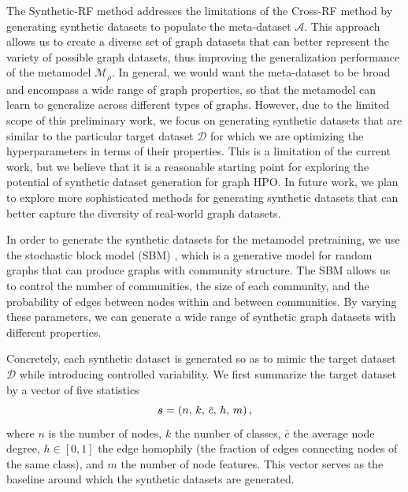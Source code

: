 The Synthetic-RF method addresses the limitations of the Cross-RF method by generating synthetic datasets to populate the meta-dataset \( \mathcal{A} \). This approach allows us to create a diverse set of graph datasets that can better represent the variety of possible graph datasets, thus improving the generalization performance of the metamodel \( \mathcal{M}_\rho \). In general, we would want the meta-dataset to be broad and encompass a wide range of graph properties, so that the metamodel can learn to generalize across different types of graphs. However, due to the limited scope of this preliminary work, we focus on generating synthetic datasets that are similar to the particular target dataset \( \mathcal{D} \) for which we are optimizing the hyperparameters in terms of their properties. This is a limitation of the current work, but we believe that it is a reasonable starting point for exploring the potential of synthetic dataset generation for graph HPO\@. In future work, we plan to explore more sophisticated methods for generating synthetic datasets that can better capture the diversity of real-world graph datasets.

In order to generate the synthetic datasets for the metamodel pretraining, we use the stochastic block model (SBM) \cite{holland_stochastic_1983}, which is a generative model for random graphs that can produce graphs with community structure. The SBM allows us to control the number of communities, the size of each community, and the probability of edges between nodes within and between communities. By varying these parameters, we can generate a wide range of synthetic graph datasets with different properties.

Concretely, each synthetic dataset is generated so as to mimic the target dataset \( \mathcal{D} \) while introducing controlled variability. We first summarize the target dataset by a vector of five statistics
\begin{equation*}
	\boldsymbol{s} = \left( n, \, k, \, \bar{c}, \, h, \, m \right),
\end{equation*}
where \( n \) is the number of nodes, \( k \) the number of classes, \( \bar{c} \) the average node degree, \( h \in [0, 1] \) the edge homophily (the fraction of edges connecting nodes of the same class), and \( m \) the number of node features. This vector serves as the baseline around which the synthetic datasets are generated.

